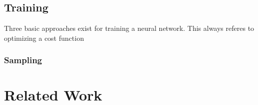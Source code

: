 \subsection{Training}
\label{sec:fund:Train}
Three basic approaches exist for training a neural network. This always referes to optimizing a cost function


\subsubsection{Sampling}
\label{sec:fund:Sampling}

\section{Related Work}
\label{sec:fund:work}
